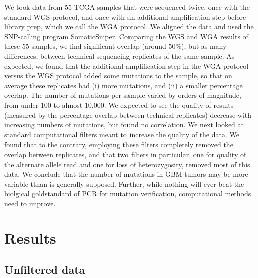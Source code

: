 \documentclass[11pt]{article} %
\begin{document}
We took data from 55 TCGA samples that were sequenced twice, once with the standard WGS protocol, and once with an additional amplification step before library prep, which we call the WGA protocol. We aligned the data and used the SNP-calling program SomaticSniper. Comparing the WGS and WGA results of these 55 samples, we find significant overlap (around 50\%), but as many differences, between technical sequencing replicates of the same sample. As expected, we found that the additional amplification step in the WGA protocol versus the WGS protocol added some mutations to the sample, so that on average these replicates had (i) more mutations, and (ii) a smaller percentage overlap. The number of mutations per sample varied by orders of magnitude, from under 100 to almost 10,000. We expected to see the quality of results (measured by the percentage overlap between technical replicates) decrease with increasing numbers of mutations, but found no correlation. We next looked at standard computational filters meant to increase the quality of the data. We found that to the contrary, employing these filters completely removed the overlap between replicates, and that two filters in particular, one for quality of the alternate allele read and one for loss of heterozygosity, removed most of this data. We conclude that the number of mutations in GBM tumors may be more variable tthan is generally supposed. Further, while nothing will ever beat the biolgical goldstandard of PCR for mutation verification, computational methods need to improve.

\section{Results}

\subsection{Unfiltered data}
\end{document}
